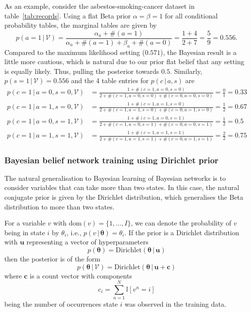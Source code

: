 \documentclass{article}
\newcommand{\giv}{\,|\,}
\begin{document}
\noindent As an example, consider the asbestos-smoking-cancer dataset in table~\ref{tab:records}. Using a flat Beta prior $\alpha = \beta = 1$ for all conditional probability tables, the marginal tables are given by 
$$
    p(a = 1 \giv \mathcal{V}) = \frac{\alpha_a + \#(a=1)}{\alpha_a + \#(a=1) + \beta_a + \#(a=0)} = \frac{1 + 4}{2 + 7} = \frac{5}{9} = 0.556.
$$
\noindent Compared to the maximum likelihood setting ($0.571$), the Bayesian result is a little more cautious, which is natural due to our prior flat belief that any setting is equally likely. Thus, pulling the posterior towards $0.5$. Similarly, $p(s = 1 \giv \mathcal{V}) = 0.556$ and the 4 table entries for $p(c \giv a, s)$ are 
\begin{align*}
    p(c = 1 \giv a = 0, s = 0, \mathcal{V}) &= \frac{1 + \#(c = 1, a = 0, s = 0)}{2 + \#(c = 1, a = 0, s = 0) + \#(c = 0, a = 0, s = 0)} = \frac{0}{1} = 0.33 \\[1em]
    p(c = 1 \giv a = 1, s = 0, \mathcal{V}) &= \frac{1 + \#(c = 1, a = 1, s = 0)}{2 + \#(c = 1, a = 1, s = 0) + \#(c = 0, a = 1, s = 0)} = \frac{1}{2} = 0.67 \\[1em]
    p(c = 1 \giv a = 0, s = 1, \mathcal{V}) &= \frac{1 + \#(c = 1, a = 0, s = 1)}{2 + \#(c = 1, a = 0, s = 1) + \#(c = 0, a = 0, s = 1)} = \frac{1}{2} = 0.5 \\[1em]
    p(c = 1 \giv a = 1, s = 1, \mathcal{V}) &= \frac{1 + \#(c = 1, a = 1, s = 1)}{2 + \#(c = 1, a = 1, s = 1) + \#(c = 0, a = 1, s = 1)} = \frac{2}{2} = 0.75 
\end{align*}

\subsubsection{Bayesian belief network training using Dirichlet prior}

The natural generalisation to Bayesian learning of Bayesian networks is to consider variables that can take more than two states. In this case, the natural conjugate prior is given by the Dirichlet distribution, which generalises the Beta distribution to more than two states. 

For a variable $v$ with $\text{dom}(v) = \{1, \dots, I\}$, we can denote the probability of $v$ being in state $i$ by $\theta_i$, i.e., $p(v \giv \bm{\theta}) = \theta_i$. If the prior is a Dirichlet distribution with $\mathbf{u}$ representing a vector of hyperparameters 
$$
    p(\bm{\theta}) = \text{Dirichlet}(\bm{\theta} \giv \mathbf{u})
$$
\noindent then the posterior is of the form
$$
    p(\bm{\theta} \giv \mathcal{V}) = \text{Dirichlet}(\bm{\theta} \giv \mathbf{u} + \mathbf{c})
$$
\noindent where $\mathbf{c}$ is a count vector with components
$$
    c_i = \sum_{n=1}^N \mathbb{I}[v^n = i]
$$
\noindent being the number of occurrences state $i$ was observed in the training data. 
\end{document}
